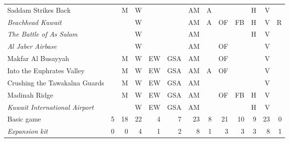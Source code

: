 \documentclass[a4paper]{article}
\newenvironment{texte}{\rmfamily\footnotesize}{}
\begin{document}
\begin{texte}
\begin{tabular}{lrrrrrrrrrrrr}
     Saddam Strikes Back                           &   &  M &  W &    &     & AM & A &    &    & H &  V &   \\
\it  Beachhead Kuwait                              &   &    &  W &    &     & AM & A & OF & FB & H &  V & R \\
\it  The Battle of As Salam                        &   &    &  W &    &     & AM &   &    &    & H &  V &   \\
\it  Al Jaber Airbase                              &   &    &  W &    &     & AM &   & OF &    &   &  V &   \\
     Makfar Al Busayyah                            &   &  M &  W & EW & GSA & AM &   & OF &    &   &  V &   \\
     Into the Euphrates Valley                     &   &  M &  W & EW & GSA & AM & A & OF &    &   &  V &   \\
     Crushing the Tawakalna Guards                 &   &  M &  W & EW & GSA & AM &   &    &    &   &  V &   \\
     Madinah Ridge                                 &   &  M &  W & EW & GSA & AM &   & OF & FB & H &  V &   \\
\it  Kuwait International Airport                  &   &    &  W & EW & GSA & AM &   &    &    & H &  V &   \\
\hline
    Basic game                                     & 5 & 18 & 22 &  4 &  7  & 23 & 8 & 21 & 10 & 9 & 23 & 0 \\
\it Expansion kit                                  & 0 &  0 &  4 &  1 &  2  &  8 & 1 &  3 &  3 & 3 &  8 & 1 \\
\end{tabular}

\end{texte}
\end{document}
